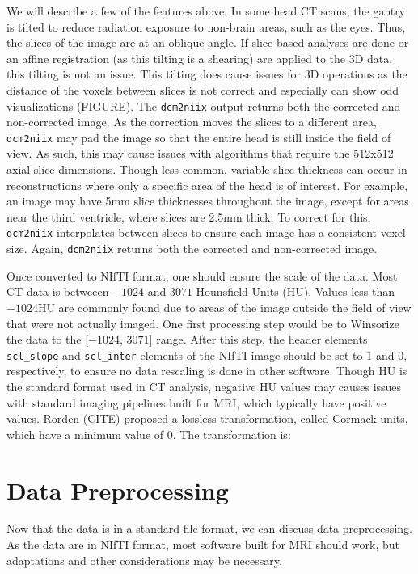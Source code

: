 \documentclass[]{elsarticle} %
\begin{document}
We will describe a few of the features above. In some head CT scans, the
gantry is tilted to reduce radiation exposure to non-brain areas, such
as the eyes. Thus, the slices of the image are at an oblique angle. If
slice-based analyses are done or an affine registration (as this tilting
is a shearing) are applied to the 3D data, this tilting is not an issue.
This tilting does cause issues for 3D operations as the distance of the
voxels between slices is not correct and especially can show odd
visualizations (FIGURE). The \texttt{dcm2niix} output returns both the
corrected and non-corrected image. As the correction moves the slices to
a different area, \texttt{dcm2niix} may pad the image so that the entire
head is still inside the field of view. As such, this may cause issues
with algorithms that require the 512x512 axial slice dimensions. Though
less common, variable slice thickness can occur in reconstructions where
only a specific area of the head is of interest. For example, an image
may have 5mm slice thicknesses throughout the image, except for areas
near the third ventricle, where slices are 2.5mm thick. To correct for
this, \texttt{dcm2niix} interpolates between slices to ensure each image
has a consistent voxel size. Again, \texttt{dcm2niix} returns both the
corrected and non-corrected image.

Once converted to NIfTI format, one should ensure the scale of the data.
Most CT data is betweeen \(-1024\) and \(3071\) Hounsfield Units (HU).
Values less than \(-1024\)HU are commonly found due to areas of the
image outside the field of view that were not actually imaged. One first
processing step would be to Winsorize the data to the {[}\(-1024\),
\(3071\){]} range. After this step, the header elements
\texttt{scl\_slope} and \texttt{scl\_inter} elements of the NIfTI image
should be set to \(1\) and \(0\), respectively, to ensure no data
rescaling is done in other software. Though HU is the standard format
used in CT analysis, negative HU values may causes issues with standard
imaging pipelines built for MRI, which typically have positive values.
Rorden (CITE) proposed a lossless transformation, called Cormack units,
which have a minimum value of \(0\). The transformation is:

\hypertarget{data-preprocessing}{%
\section{Data Preprocessing}\label{data-preprocessing}}

Now that the data is in a standard file format, we can discuss data
preprocessing. As the data are in NIfTI format, most software built for
MRI should work, but adaptations and other considerations may be
necessary.
\end{document}
